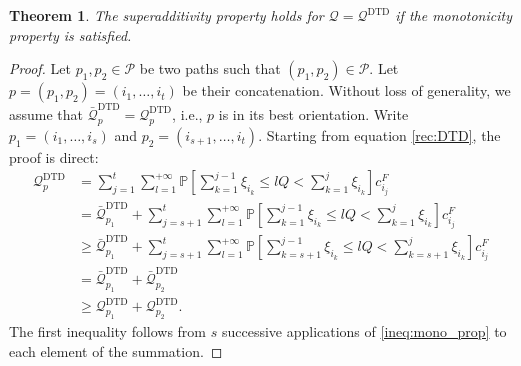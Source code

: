 \documentclass{article}
\newtheorem{theorem}{Theorem}
\begin{document}
\begin{theorem}\label{thm:Q_DTD_superadditive} 
    The superadditivity property holds for $\mathcal{Q}=\mathcal{Q}^{\text{DTD}}$ if the monotonicity property is satisfied.
\end{theorem}
\begin{proof}
Let $p_1,p_2 \in \mathcal{P}$ be two paths such that $(p_1,p_2)\in \mathcal{P}$. Let $p = (p_1,p_2) = (i_1,\dots,i_t)$ be their concatenation. Without loss of generality, we assume that $\bar{\mathcal{Q}}^{\text{DTD}}_p = \mathcal{Q}^{\text{DTD}}_p$, i.e., $p$ is in its best orientation. Write $p_1=(i_1,\dots,i_s)$ and $p_2=(i_{s+1},\dots,i_t)$. Starting from equation \eqref{rec:DTD}, the proof is direct:
\begingroup
\allowdisplaybreaks
\begin{align*}
    \mathcal{Q}^{\text{DTD}}_p &= \sum_{j=1}^t\sum_{l=1}^{+\infty}\mathbb{P}\left[ \sum_{k=1}^{j-1}\xi_{i_k} \leq lQ < \sum_{k=1}^j\xi_{i_k} \right]c^F_{i_{j}}\\
    &= \bar{\mathcal{Q}}^{\text{DTD}}_{p_1} + \sum_{j=s+1}^t\sum_{l=1}^{+\infty} \mathbb{P}\left[ \sum_{k=1}^{j-1}\xi_{i_k} \leq lQ < \sum_{k=1}^j\xi_{i_k} \right]c^F_{i_{j}}\\
    &\geq \bar{\mathcal{Q}}^{\text{DTD}}_{p_1} + \sum_{j=s+1}^t\sum_{l=1}^{+\infty}\mathbb{P}\left[ \sum_{k=s+1}^{j-1}\xi_{i_k} \leq lQ < \sum_{k=s+1}^j\xi_{i_k} \right]c^F_{i_{j}}\\
    &= \bar{\mathcal{Q}}^{\text{DTD}}_{p_1} + \bar{\mathcal{Q}}^{\text{DTD}}_{p_2}\\
    &\geq \mathcal{Q}^{\text{DTD}}_{p_1} + \mathcal{Q}^{\text{DTD}}_{p_2}.
\end{align*}
\endgroup
The first inequality follows from $s$ successive applications of \eqref{ineq:mono_prop} to each element of the summation.
\end{proof}
\end{document}
